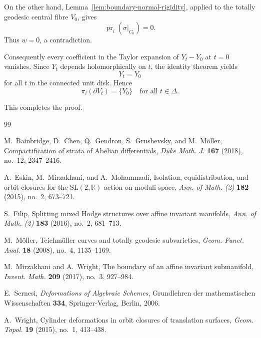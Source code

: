 \documentclass[11pt]{amsart}
\theoremstyle{definition}
\theoremstyle{remark}
\newcommand{\DD}{\Delta}
\begin{document}
On the other hand, Lemma~\ref{lem:boundary-normal-rigidity}, applied to
the totally geodesic central fibre \(V_0\), gives
\[
\operatorname{pr}_i(\sigma|_{C_0})=0.
\]
Thus \(w=0\), a contradiction.

Consequently every coefficient in the Taylor expansion of \(Y_t-Y_0\) at
\(t=0\) vanishes. Since \(Y_t\) depends holomorphically on \(t\), the
identity theorem yields
\[
Y_t=Y_0
\]
for all \(t\) in the connected unit disk. Hence
\[
\boxed{\ \pi_i(\partial V_t)=\{Y_0\}\quad\text{for all }t\in\DD.\ }
\]

This completes the proof.

\begin{thebibliography}{99}

M.~Bainbridge, D.~Chen, Q.~Gendron, S.~Grushevsky, and M.~M\"oller,
\newblock Compactification of strata of Abelian differentials,
\newblock \emph{Duke Math. J.} \textbf{167} (2018), no.~12, 2347--2416.

A.~Eskin, M.~Mirzakhani, and A.~Mohammadi,
\newblock Isolation, equidistribution, and orbit closures for the
\(\mathrm{SL}(2,\mathbb R)\) action on moduli space,
\newblock \emph{Ann. of Math. (2)} \textbf{182} (2015), no.~2, 673--721.

S.~Filip,
\newblock Splitting mixed Hodge structures over affine invariant manifolds,
\newblock \emph{Ann. of Math. (2)} \textbf{183} (2016), no.~2, 681--713.

M.~M\"oller,
\newblock Teichm\"uller curves and totally geodesic subvarieties,
\newblock \emph{Geom. Funct. Anal.} \textbf{18} (2008), no.~4, 1135--1169.

M.~Mirzakhani and A.~Wright,
\newblock The boundary of an affine invariant submanifold,
\newblock \emph{Invent. Math.} \textbf{209} (2017), no.~3, 927--984.

E.~Sernesi,
\newblock \emph{Deformations of Algebraic Schemes},
\newblock Grundlehren der mathematischen Wissenschaften \textbf{334},
Springer-Verlag, Berlin, 2006.

A.~Wright,
\newblock Cylinder deformations in orbit closures of translation surfaces,
\newblock \emph{Geom. Topol.} \textbf{19} (2015), no.~1, 413--438.

\end{thebibliography}
\end{document}
